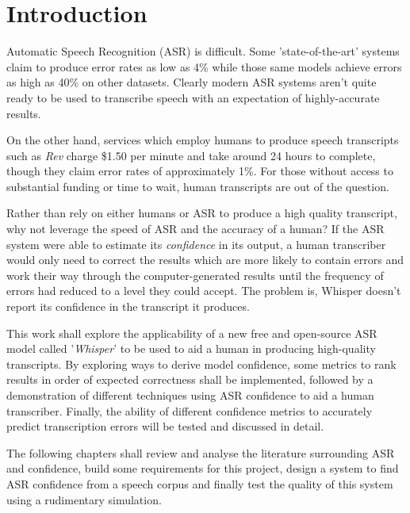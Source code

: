 \chapter{Introduction}\label{ch:introduction}

Automatic Speech Recognition (ASR) is difficult.
Some 'state-of-the-art' systems claim to produce error rates as low as 4\%\cite{wav2vec2} while those same models achieve errors as high as 40\% on other datasets\cite{szymanski2020we}.
Clearly modern ASR systems aren't quite ready to be used to transcribe speech with an expectation of highly-accurate results.

On the other hand, services which employ humans to produce speech transcripts such as \emph{Rev}\cite{rev} charge \$1.50 per minute and take around 24 hours to complete, though they claim error rates of approximately 1\%.
For those without access to substantial funding or time to wait, human transcripts are out of the question.

Rather than rely on either humans or ASR to produce a high quality transcript, why not leverage the speed of ASR and the accuracy of a human?
If the ASR system were able to estimate its \emph{confidence} in its output, a human transcriber would only need to correct the results which are more likely to contain errors and work their way through the computer-generated results until the frequency of errors had reduced to a level they could accept.
The problem is, Whisper doesn't report its confidence in the transcript it produces.

This work shall explore the applicability of a new free and open-source ASR model called '\emph{Whisper}'\cite{whisper} to be used to aid a human in producing high-quality transcripts.
By exploring ways to derive model confidence, some metrics to rank results in order of expected correctness shall be implemented, followed by a demonstration of different techniques using ASR confidence to aid a human transcriber.
Finally, the ability of different confidence metrics to accurately predict transcription errors will be tested and discussed in detail.

The following chapters shall review and analyse the literature surrounding ASR and confidence, build some requirements for this project, design a system to find ASR confidence from a speech corpus and finally test the quality of this system using a rudimentary simulation.
